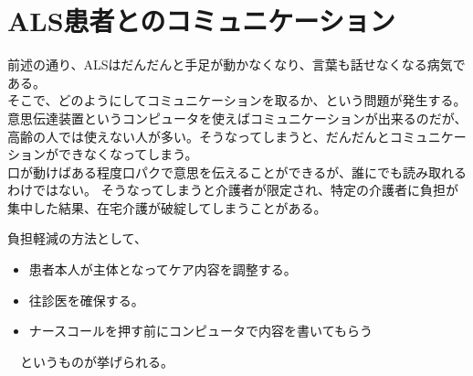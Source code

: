 \documentclass{jsarticle}
\begin{document}
 \section{ALS患者とのコミュニケーション}
 前述の通り、ALSはだんだんと手足が動かなくなり、言葉も話せなくなる病気である。\\
 そこで、どのようにしてコミュニケーションを取るか、という問題が発生する。\\
 
 意思伝達装置というコンピュータを使えばコミュニケーションが出来るのだが、高齢の人では使えない人が多い。そうなってしまうと、だんだんとコミュニケーションができなくなってしまう。\\
 
 口が動けばある程度口パクで意思を伝えることができるが、誰にでも読み取れるわけではない。
 そうなってしまうと介護者が限定され、特定の介護者に負担が集中した結果、在宅介護が破綻してしまうことがある。
 
 負担軽減の方法として、
 \begin{itemize}
  \item 患者本人が主体となってケア内容を調整する。
  \item 往診医を確保する。
  \item ナースコールを押す前にコンピュータで内容を書いてもらう
 \end{itemize}
　というものが挙げられる。
　
\end{document}
